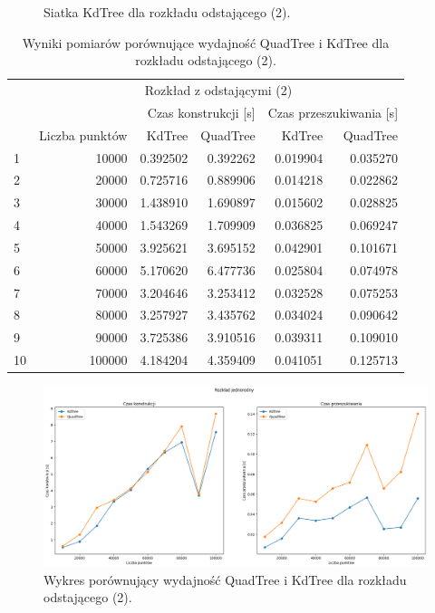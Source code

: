 \documentclass{lab}
\begin{document}
\begin{figure}[H]
\begin{minipage}{0.495\textwidth}
      \caption{Siatka KdTree dla rozkładu odstającego (2).}
      \label{fig:outlier_KdTree_2}
  \end{minipage}
\end{figure}

\begin{table}[H]
\centering
\begin{tabular}{lrrrrr}
  \toprule
   & \multicolumn{5}{c}{Rozkład z odstającymi (2)} \\
   &  & \multicolumn{2}{r}{Czas konstrukcji [s]} & \multicolumn{2}{r}{Czas przeszukiwania [s]} \\
   & Liczba punktów & KdTree & QuadTree & KdTree & QuadTree \\
  \midrule
1 & 10000 & 0.392502 & 0.392262 & 0.019904 & 0.035270 \\
2 & 20000 & 0.725716 & 0.889906 & 0.014218 & 0.022862 \\
3 & 30000 & 1.438910 & 1.690897 & 0.015602 & 0.028825 \\
4 & 40000 & 1.543269 & 1.709909 & 0.036825 & 0.069247 \\
5 & 50000 & 3.925621 & 3.695152 & 0.042901 & 0.101671 \\
6 & 60000 & 5.170620 & 6.477736 & 0.025804 & 0.074978 \\
7 & 70000 & 3.204646 & 3.253412 & 0.032528 & 0.075253 \\
8 & 80000 & 3.257927 & 3.435762 & 0.034024 & 0.090642 \\
9 & 90000 & 3.725386 & 3.910516 & 0.039311 & 0.109010 \\
10 & 100000 & 4.184204 & 4.359409 & 0.041051 & 0.125713 \\
  \bottomrule
  \end{tabular}
\caption{Wyniki pomiarów porównujące wydajność QuadTree i KdTree dla rozkładu odstającego (2).}
\label{tab:outlier_time_2}
\end{table}  

\begin{figure}[H]
  \centering
  \includegraphics[width=1\textwidth]{resources/outlier_graph_2.png}
  \caption{Wykres porównujący wydajność QuadTree i KdTree dla rozkładu odstającego (2).}
  \label{fig:outlier_graph_2}
\end{figure}
\end{document}
